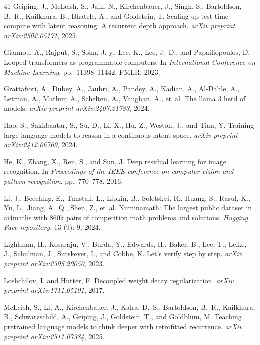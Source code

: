 \begin{thebibliography}{41}
Geiping, J., McLeish, S., Jain, N., Kirchenbauer, J., Singh, S., Bartoldson,
  B.~R., Kailkhura, B., Bhatele, A., and Goldstein, T.
\newblock Scaling up test-time compute with latent reasoning: A recurrent depth
  approach.
\newblock \textit{arXiv preprint arXiv:2502.05171}, 2025.

Giannou, A., Rajput, S., Sohn, J.-y., Lee, K., Lee, J.~D., and Papailiopoulos,
  D.
\newblock Looped transformers as programmable computers.
\newblock In \textit{International Conference on Machine Learning}, pp.\
  11398--11442. PMLR, 2023.

Grattafiori, A., Dubey, A., Jauhri, A., Pandey, A., Kadian, A., Al-Dahle, A.,
  Letman, A., Mathur, A., Schelten, A., Vaughan, A., et~al.
\newblock The llama 3 herd of models.
\newblock \textit{arXiv preprint arXiv:2407.21783}, 2024.

Hao, S., Sukhbaatar, S., Su, D., Li, X., Hu, Z., Weston, J., and Tian, Y.
\newblock Training large language models to reason in a continuous latent
  space.
\newblock \textit{arXiv preprint arXiv:2412.06769}, 2024.

He, K., Zhang, X., Ren, S., and Sun, J.
\newblock Deep residual learning for image recognition.
\newblock In \textit{Proceedings of the IEEE conference on computer vision and
  pattern recognition}, pp.\  770--778, 2016.

Li, J., Beeching, E., Tunstall, L., Lipkin, B., Soletskyi, R., Huang, S.,
  Rasul, K., Yu, L., Jiang, A.~Q., Shen, Z., et~al.
\newblock Numinamath: The largest public dataset in ai4maths with 860k pairs of
  competition math problems and solutions.
\newblock \textit{Hugging Face repository}, 13 (9): 9, 2024.

Lightman, H., Kosaraju, V., Burda, Y., Edwards, H., Baker, B., Lee, T., Leike,
  J., Schulman, J., Sutskever, I., and Cobbe, K.
\newblock Let's verify step by step.
\newblock \textit{arXiv preprint arXiv:2305.20050}, 2023.

Loshchilov, I. and Hutter, F.
\newblock Decoupled weight decay regularization.
\newblock \textit{arXiv preprint arXiv:1711.05101}, 2017.

McLeish, S., Li, A., Kirchenbauer, J., Kalra, D.~S., Bartoldson, B.~R.,
  Kailkhura, B., Schwarzschild, A., Geiping, J., Goldstein, T., and Goldblum,
  M.
\newblock Teaching pretrained language models to think deeper with retrofitted
  recurrence.
\newblock \textit{arXiv preprint arXiv:2511.07384}, 2025.


\end{thebibliography}
